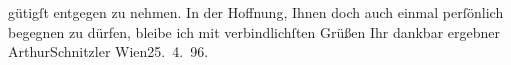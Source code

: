 \begin{ledgroupsized}[t]{13cm}
                    gütigſt entgegen zu nehmen.\pend
           \pstart {\pb}In der Hoffnung, Ihnen doch auch einmal
                    perſönlich begegnen zu dürfen, bleibe ich mit verbindlichſten Grüßen Ihr dankbar
                    ergebner \spacefill\mbox{ArthurSchnitzler}\pend{}\pstart
           Wien25. 4. 96.\pend
           \endnumbering{}\end{ledgroupsized}  \newcommand{\dateiname}{L00542}\newcommand{\titel}{Arthur Schnitzler an Georg Brandes, 25. 4. 1896}\newcommand{\editorInnen}{Martin Anton Müller und Gerd-Hermann Susen}
      